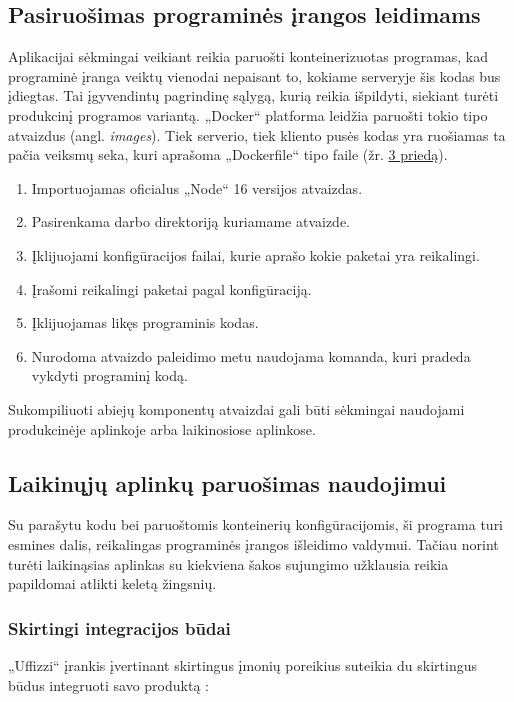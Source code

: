 \documentclass{VUMIFPSkursinis}
\begin{document}
\subsection{Pasiruošimas programinės įrangos leidimams}

Aplikacijai sėkmingai veikiant reikia paruošti konteinerizuotas programas, kad programinė įranga veiktų vienodai nepaisant to, kokiame serveryje šis kodas bus įdiegtas. Tai įgyvendintų pagrindinę sąlygą, kurią reikia išpildyti, siekiant turėti produkcinį programos variantą. „Docker“ platforma leidžia paruošti tokio tipo atvaizdus (angl. \textit{images}). Tiek serverio, tiek kliento pusės kodas yra ruošiamas ta pačia veiksmų seka, kuri aprašoma „Dockerfile“ tipo faile (žr. \hyperref[priedas3]{3 priedą}).

\begin{enumerate}
  \item Importuojamas oficialus „Node“ 16 versijos atvaizdas.
  \item Pasirenkama darbo direktoriją kuriamame atvaizde.
  \item Įklijuojami konfigūracijos failai, kurie aprašo kokie paketai yra reikalingi.
  \item Įrašomi reikalingi paketai pagal konfigūraciją.
  \item Įklijuojamas likęs programinis kodas.
  \item Nurodoma atvaizdo paleidimo metu naudojama komanda, kuri pradeda vykdyti programinį kodą.
\end{enumerate}

Sukompiliuoti abiejų komponentų atvaizdai gali būti sėkmingai naudojami produkcinėje aplinkoje arba laikinosiose aplinkose.

\subsection{Laikinųjų aplinkų paruošimas naudojimui}

Su parašytu kodu bei paruoštomis konteinerių konfigūracijomis, ši programa turi esmines dalis, reikalingas programinės įrangos išleidimo valdymui. Tačiau norint turėti laikinąsias aplinkas su kiekviena šakos sujungimo užklausia reikia papildomai atlikti keletą žingsnių.

    \subsubsection{Skirtingi integracijos būdai}

„Uffizzi“ įrankis įvertinant skirtingus įmonių poreikius suteikia du skirtingus būdus integruoti savo produktą \cite{SaltKeturioliktas}:
\end{document}
